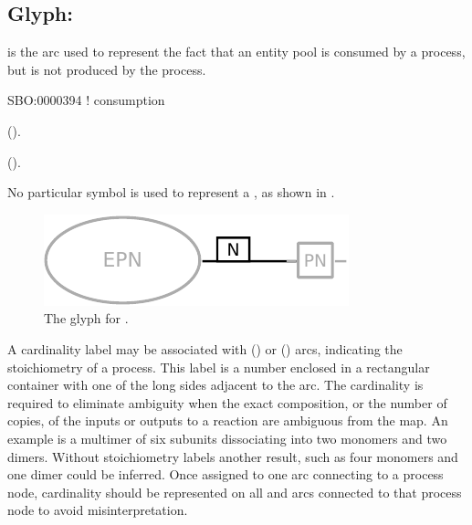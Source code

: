 \subsection{Glyph: }
\label{sec:consumption}

 is the arc used to represent the fact that an entity pool is consumed by a process, but is not produced by the process.

\begin{glyphDescription}

\glyphSboTerm
SBO:0000394 ! consumption

\glyphOrigin
{}  ().

\glyphTarget
{}  ().

\glyphSymbol
No particular symbol is used to represent a , as shown in .

\end{glyphDescription}

\begin{figure}[H]
  \centering
  \includegraphics{images/consumption}
  \caption{The \PD glyph for .}
  \label{fig:consumption}
\end{figure}

A cardinality label may be associated with  () or  () arcs, indicating the stoichiometry of a process.
This label is a number enclosed in a rectangular container with one of the long sides adjacent to the  arc.
The cardinality is required to eliminate ambiguity when the exact composition, or the number of copies, of the inputs or outputs to a reaction are ambiguous from the map.
An example is a multimer of six subunits dissociating into two monomers and two dimers.
Without stoichiometry labels another result, such as four monomers and one dimer could be inferred.
Once assigned to one arc connecting to a process node, cardinality should be represented on all  and  arcs connected to that process node to avoid misinterpretation.

